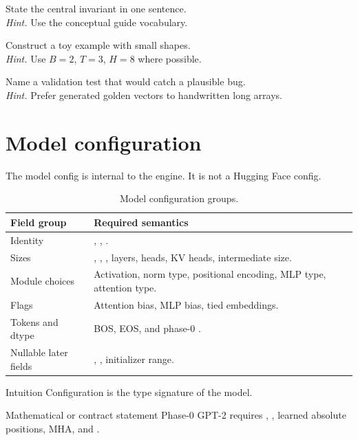 \begin{chapterexercises}
\item State the central invariant in one sentence.\\
\textit{Hint.} Use the conceptual guide vocabulary.
\item Construct a toy example with small shapes.\\
\textit{Hint.} Use $B=2$, $T=3$, $H=8$ where possible.
\item Name a validation test that would catch a plausible bug.\\
\textit{Hint.} Prefer generated golden vectors to handwritten long arrays.
\end{chapterexercises}

\chapter{Model configuration}
\label{ch:model-config}
The model config is internal to the engine. It is not a Hugging Face config.


\begin{table}[htbp]\centering\small
\begin{tabularx}{\textwidth}{L{0.30\textwidth}Y}
\toprule
Field group & Required semantics \\
\midrule
Identity & , , . \\
Sizes & , , , layers, heads, KV heads, intermediate size. \\
Module choices & Activation, norm type, positional encoding, MLP type, attention type. \\
Flags & Attention bias, MLP bias, tied embeddings. \\
Tokens and dtype & BOS, EOS, and phase-0 . \\
Nullable later fields & , , initializer range. \\
\bottomrule
\end{tabularx}
\caption{Model configuration groups.}
\end{table}


\begin{intuitionbox}{Intuition}
Configuration is the type signature of the model.
\end{intuitionbox}

\begin{definitionbox}{Mathematical or contract statement}
Phase-0 GPT-2 requires , , learned absolute positions, MHA, and .
\end{definitionbox}


